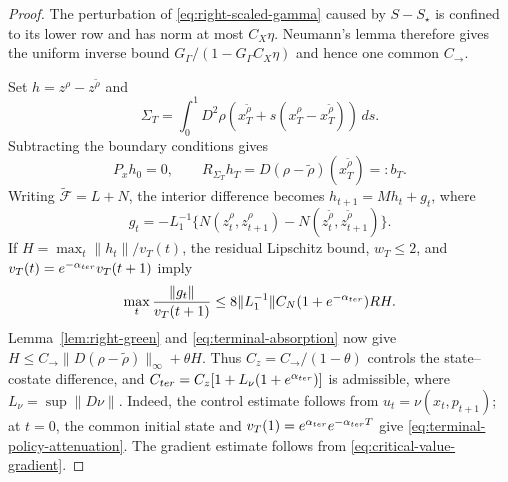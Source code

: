 \documentclass[twocolumn,nameyear,amsthm]{autart}
\numberwithin{equation}{section}
\begin{document}
\begin{proof}
The perturbation of \eqref{eq:right-scaled-gamma} caused by $S-S_\star$ is
confined to its lower row and has norm at most $C_X\eta$.  Neumann's lemma
therefore gives the uniform inverse bound
$G_\Gamma/(1-G_\Gamma C_X\eta)$ and hence one common $C_{\to}$.

Set $h=z^\rho-z^{\widetilde\rho}$ and
\[
 \Sigma_T=\int_0^1D^2\rho(x_T^{\widetilde\rho}
 +s(x_T^\rho-x_T^{\widetilde\rho}))\,ds .
\]
Subtracting the boundary conditions gives
\begin{equation}\label{eq:terminal-difference-row}
 P_xh_0=0,\qquad R_{\Sigma_T}h_T
 =D(\rho-\widetilde\rho)(x_T^{\widetilde\rho})=:b_T.
\end{equation}
Writing $\widetilde{\mathcal F}=L+N$, the interior difference becomes
$h_{t+1}=Mh_t+g_t$, where
\[
 g_t=-L_1^{-1}\{N(z_t^\rho,z_{t+1}^\rho)
 -N(z_t^{\widetilde\rho},z_{t+1}^{\widetilde\rho})\}.
\]
If $H=\max_t\|h_t\|/v_T(t)$, the residual Lipschitz bound, $w_T\le2$, and
$v_T(t)=e^{-\alpha_{\rm ter}}v_T(t+1)$ imply
\[
 \max_t\frac{\|g_t\|}{v_T(t+1)}
 \le8\|L_1^{-1}\|C_N(1+e^{-\alpha_{\rm ter}})RH.
\]
Lemma~\ref{lem:right-green} and \eqref{eq:terminal-absorption} now give
$H\le C_{\to}\|D(\rho-\widetilde\rho)\|_\infty+\theta H$.
Thus $C_z=C_{\to}/(1-\theta)$ controls the state--costate difference, and
$C_{\rm ter}=C_z[1+L_\nu(1+e^{\alpha_{\rm ter}})]$ is admissible, where
$L_\nu=\sup\|D\nu\|$.  Indeed, the control estimate follows from
$u_t=\nu(x_t,p_{t+1})$; at $t=0$, the common initial state and
$v_T(1)=e^{\alpha_{\rm ter}}e^{-\alpha_{\rm ter}T}$ give
\eqref{eq:terminal-policy-attenuation}.  The gradient estimate follows from
\eqref{eq:critical-value-gradient}.
\end{proof}
\end{document}
